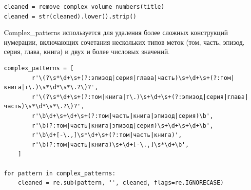 \documentclass[coursework]{SCWorks}
\begin{document}
    \begin{verbatim}
cleaned = remove_complex_volume_numbers(title)
cleaned = str(cleaned).lower().strip()
    \end{verbatim}


    Complex\_patterns используется для удаления более сложных конструкций нумерации, включающих сочетания нескольких типов меток
    (том, часть, эпизод, серия, глава, книга) и двух и более числовых значений.

    \begin{verbatim}
complex_patterns = [
        r'\(?\s*\d+\s+(?:эпизод|серия|глава|часть)\s+\d+\s+(?:том|книга|т\.)\s*\d*\s*\.?\)?',
        r'\(?\s*\d+\s+(?:том|книга|т\.)\s+\d+\s+(?:эпизод|серия|глава|часть)\s*\d*\s*\.?\)?',
        r'\b\d+\s+\d+\s+(?:том|часть|книга|эпизод|серия)\b',
        r'\b(?:том|часть|книга|эпизод|серия)\s+\d+\s+\d+\b',
        r'\b\d+[-\.,]\s*\d+\s+(?:том|часть|книга)',
        r'\b(?:том|часть|книга)\s+\d+[-\.,]\s*\d+\b',
    ]

for pattern in complex_patterns:
    cleaned = re.sub(pattern, '', cleaned, flags=re.IGNORECASE)
    \end{verbatim}
\end{document}
